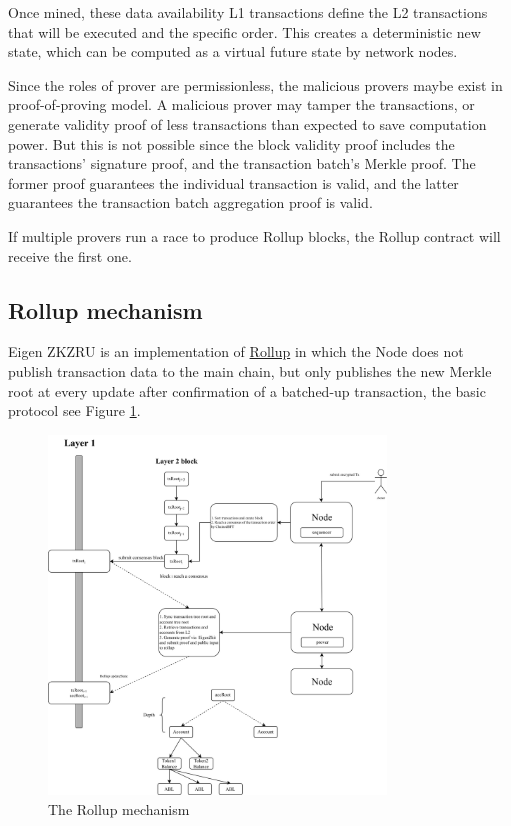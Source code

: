 \documentclass{article}
\begin{document}
Once mined, these data availability L1 transactions define the L2 transactions that will be executed and the specific order. This creates a deterministic new state, which can be computed as a virtual future state by network nodes.

Since the roles of prover are permissionless, the malicious provers maybe exist in proof-of-proving model. A malicious prover may tamper the transactions, or generate validity proof of less transactions than expected to save computation power. But this is not possible  since the block validity proof includes the transactions' signature proof, and the transaction batch's Merkle proof. The former proof guarantees the individual transaction is valid, and the latter guarantees the transaction batch aggregation proof is valid. 

If multiple provers run a race to produce Rollup blocks, the Rollup contract will receive the first one.   


\subsection{Rollup mechanism}

Eigen ZKZRU is an implementation of \href{https://vitalik.ca/general/2021/01/05/rollup.html}{Rollup} in which the Node does not publish transaction data to the main chain, but only publishes the new Merkle root at every update after confirmation of a batched-up transaction, the basic protocol see Figure \ref{fig:rollup}.

\begin{figure}
    \centering
    \includegraphics[width=0.8\textwidth]{rollup.drawio.png}
    \caption{\label{fig:rollup}The Rollup mechanism}
\end{figure}
\end{document}
